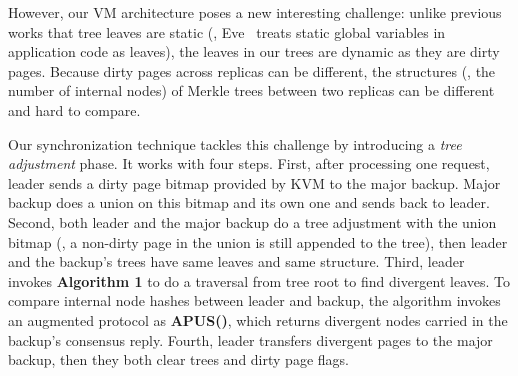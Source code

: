 However, our VM architecture poses a new interesting challenge: unlike 
previous works that tree leaves are static (\eg, Eve~\cite{eve:osdi12} treats 
static global variables in application code as leaves), the leaves in our trees 
are dynamic as they are dirty pages. Because dirty pages across replicas can be 
different, the structures (\ie, the number of internal nodes) of Merkle trees 
between two replicas can be different and hard to compare.

Our synchronization technique tackles this challenge by introducing a 
\emph{tree adjustment} phase. It works with four steps. First, after 
processing one request, leader sends a dirty page bitmap provided by KVM to 
the major backup. Major backup does a union on this bitmap and its own one 
and sends back to leader. Second, both leader and the major backup do 
a tree adjustment with the union bitmap (\eg, a non-dirty page in the union is 
still appended to the tree), then leader and the backup's trees have same leaves 
and same structure. Third, leader invokes \textbf{Algorithm 1} to do a 
 traversal from tree root to find divergent leaves. To compare 
internal node hashes between leader and backup, the algorithm invokes an 
augmented \falcon protocol as \textbf{APUS()}, which returns divergent nodes 
carried in the backup's consensus reply. Fourth, leader transfers divergent 
pages to the major backup, then they both clear trees and dirty page flags.

